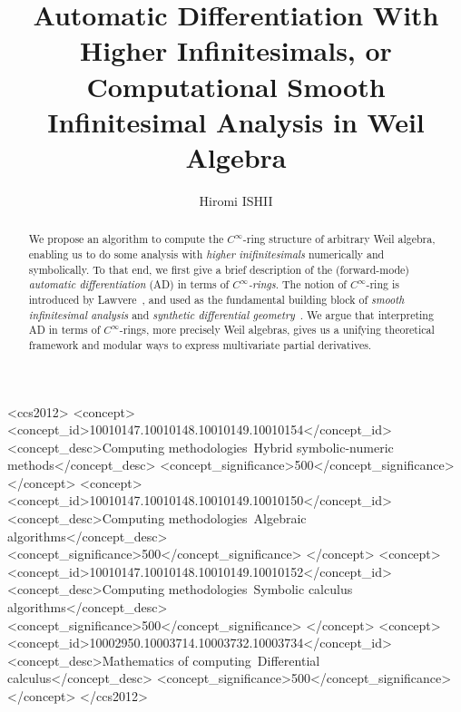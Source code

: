 \documentclass[%
  sigconf,authorversion,screen]{acmart}
\begin{document}
\title[Automatic Differentiation With Higher Infinitesimals]{Automatic Differentiation With Higher Infinitesimals, or Computational Smooth Infinitesimal Analysis in Weil Algebra}

\author{Hiromi ISHII}

\renewcommand{\shortauthors}{Hiromi ISHII}

\begin{abstract}
  \frenchspacing
  We propose an algorithm to compute the $C^\infty$-ring structure of arbitrary Weil algebra, enabling us to do some analysis with \emph{higher inifinitesimals} numerically and symbolically.
  To that end, we first give a brief description of the (forward-mode) \emph{automatic differentiation} (AD) in terms of \emph{$C^\infty$-rings}.
  The notion of $C^\infty$-ring is introduced by Lawvere~\cite{lawvere1979categorical}, and used as the fundamental building block of \emph{smooth infinitesimal analysis} and \emph{synthetic differential geometry}~\cite{Moerdijk:1991aa}.
  We argue that interpreting AD in terms of $C^\infty$-rings, more precisely Weil algebras, gives us a unifying theoretical framework and modular ways to express multivariate partial derivatives.
\end{abstract}

\begin{CCSXML}
<ccs2012>
    <concept>
        <concept_id>10010147.10010148.10010149.10010154</concept_id>
        <concept_desc>Computing methodologies~Hybrid symbolic-numeric methods</concept_desc>
        <concept_significance>500</concept_significance>
        </concept>
    <concept>
        <concept_id>10010147.10010148.10010149.10010150</concept_id>
        <concept_desc>Computing methodologies~Algebraic algorithms</concept_desc>
        <concept_significance>500</concept_significance>
        </concept>
    <concept>
        <concept_id>10010147.10010148.10010149.10010152</concept_id>
        <concept_desc>Computing methodologies~Symbolic calculus algorithms</concept_desc>
        <concept_significance>500</concept_significance>
        </concept>
    <concept>
        <concept_id>10002950.10003714.10003732.10003734</concept_id>
        <concept_desc>Mathematics of computing~Differential calculus</concept_desc>
        <concept_significance>500</concept_significance>
        </concept>
  </ccs2012>
\end{CCSXML}
\end{document}
